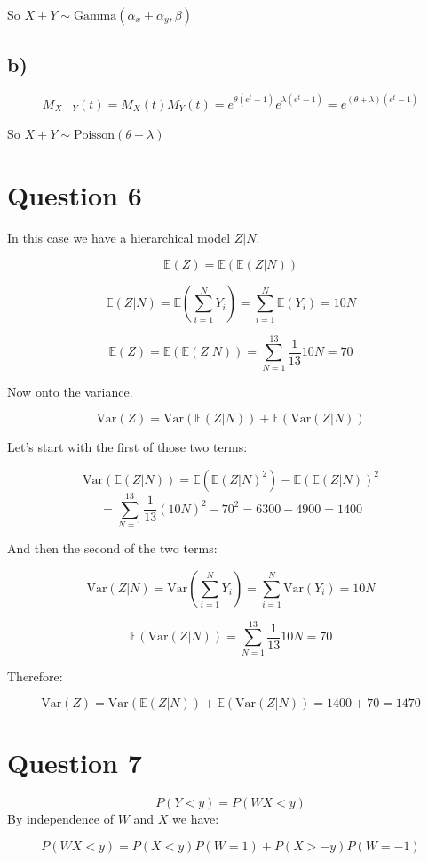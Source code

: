 \documentclass[11pt]{article}
\begin{document}
So $X+Y \sim \text{Gamma}(\alpha_x + \alpha_y, \beta)$

\subsection*{b)}

$$M_{X+Y}(t) = M_X(t) M_Y(t) = e^{\theta (e^t -1)} e^{\lambda (e^t -1)} = e^{(\theta + \lambda) (e^t -1)}  $$

So $X+Y \sim \text{Poisson}(\theta + \lambda)$

\section*{Question 6}

In this case we have a hierarchical model $Z|N$. 

$$\mathbb{E}(Z)=\mathbb{E}(\mathbb{E}(Z|N))$$

$$\mathbb{E}(Z|N) = \mathbb{E}\left(\sum_{i=1}^N Y_i\right) = \sum_{i=1}^N\mathbb{E}(Y_i)=10N$$


$$\mathbb{E}(Z) = \mathbb{E}(\mathbb{E}(Z|N)) = \sum_{N=1}^{13} \frac{1}{13} 10N=70$$

Now onto the variance.

$$\text{Var}(Z) = \text{Var}(\mathbb{E}(Z|N)) + \mathbb{E}(\text{Var}(Z|N))$$

Let's start with the first of those two terms:

$$\text{Var}(\mathbb{E}(Z|N)) = \mathbb{E}(\mathbb{E}(Z|N)^2)-\mathbb{E}(\mathbb{E}(Z|N))^2$$
$$=\sum_{N=1}^{13} \frac{1}{13} (10N)^2 - 70^2=6300-4900=1400$$

And then the second of the two terms:

$$\text{Var}(Z|N)=\text{Var}\left( \sum_{i=1}^{N} Y_i \right)=\sum_{i=1}^{N} \text{Var}\left( Y_i \right)=10N$$

$$\mathbb{E}(\text{Var}(Z|N)) = \sum_{N=1}^{13}\frac{1}{13}10N=70$$

Therefore:

$$\text{Var}(Z) = \text{Var}(\mathbb{E}(Z|N)) + \mathbb{E}(\text{Var}(Z|N))=1400 + 70= 1470$$


\section*{Question 7}

$$P(Y<y)=P(WX < y)$$ 
By independence of $W$ and $X$ we have:

$$P(WX < y)=P(X < y)P(W=1) + P(X > -y)P(W=-1)$$
\end{document}

